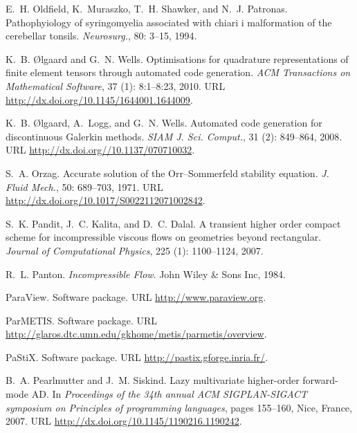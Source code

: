 \begin{thebibliography}{467}
E.~H. Oldfield, K.~Muraszko, T.~H. Shawker, and N.~J. Patronas.
\newblock Pathophyiology of syringomyelia associated with chiari i malformation
  of the cerebellar tonsils.
\newblock \emph{Neurosurg.}, 80: 3--15, 1994.

K.~B. \O{}lgaard and G.~N. Wells.
\newblock Optimisations for quadrature representations of finite element
  tensors through automated code generation.
\newblock \emph{ACM Transactions on Mathematical Software}, 37
  (1): 8:1--8:23, 2010.
\newblock URL \url{http://dx.doi.org/10.1145/1644001.1644009}.

K.~B. {\O}lgaard, A.~Logg, and G.~N. Wells.
\newblock Automated code generation for discontinuous {G}alerkin methods.
\newblock \emph{SIAM J. Sci. Comput.}, 31 (2): 849--864,
  2008.
\newblock URL \url{http://dx.doi.org//10.1137/070710032}.

S.~A. Orzag.
\newblock Accurate solution of the {O}rr--{S}ommerfeld stability equation.
\newblock \emph{J. Fluid Mech.}, 50: 689--703, 1971.
\newblock URL \url{http://dx.doi.org/10.1017/S0022112071002842}.

S.~K. Pandit, J.~C. Kalita, and D.~C. Dalal.
\newblock A transient higher order compact scheme for incompressible viscous
  flows on geometries beyond rectangular.
\newblock \emph{Journal of Computational Physics}, 225 (1):
  1100--1124, 2007.

R.~L. Panton.
\newblock \emph{Incompressible Flow}.
\newblock John Wiley \& Sons Inc, 1984.

{ParaView}.
\newblock Software package.
\newblock URL \url{http://www.paraview.org}.

ParMETIS.
\newblock Software package.
\newblock URL \url{http://glaros.dtc.umn.edu/gkhome/metis/parmetis/overview}.

PaStiX.
\newblock Software package.
\newblock URL \url{http://pastix.gforge.inria.fr/}.

B.~A. Pearlmutter and J.~M. Siskind.
\newblock Lazy multivariate higher-order forward-mode {AD}.
\newblock In \emph{Proceedings of the 34th annual ACM SIGPLAN-SIGACT symposium
  on Principles of programming languages}, pages 155--160, Nice, France, 2007.
\newblock URL \url{http://dx.doi.org/10.1145/1190216.1190242}.


\end{thebibliography}
